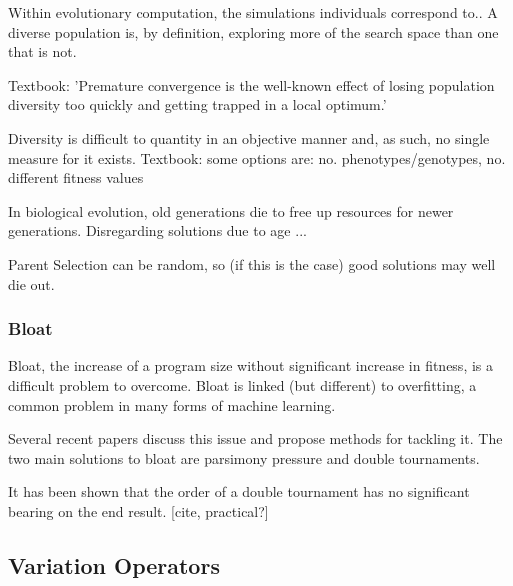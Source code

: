 \documentclass{article}
\begin{document}
Within evolutionary computation, the simulations individuals correspond to.. %
A diverse population is, by definition, exploring more of the search space than one that is not. %

Textbook: 'Premature convergence is the well-known effect of losing population diversity too quickly and getting trapped in a local optimum.'

Diversity is difficult to quantity in an objective manner and, as such, no single measure for it exists\cite{}.
Textbook:
some options are: no. phenotypes/genotypes, no. different fitness values

In biological evolution, old generations die to free up resources for newer generations.
Disregarding solutions due to age ... %

Parent Selection can be random, so (if this is the case) good solutions may well die out.


\subsubsection{Bloat}
Bloat, the increase of a program size without significant increase in fitness, is a difficult problem to overcome. Bloat is linked (but different) to overfitting, a common problem in many forms of machine learning\cite{overfitting_bloat}.

Several recent papers discuss this issue and propose methods for tackling it\cite{parsimony_pressure, multi_objective_bloat}.
The two main solutions to bloat are parsimony pressure and double tournaments.

\cite{multi_objective_bloat}

It has been shown that the order of a double tournament has no significant bearing on the end result. [cite, practical?]


\subsection{Variation Operators}
\end{document}
